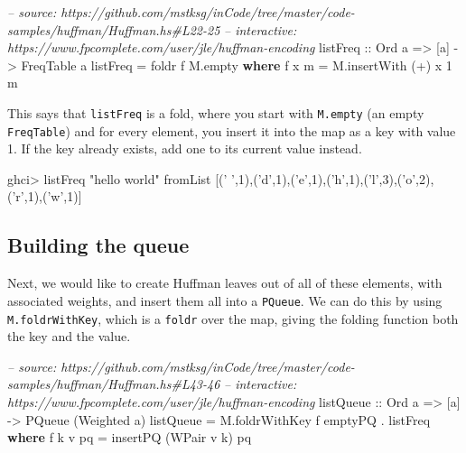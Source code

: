 \documentclass[]{article}
\newenvironment{Shaded}{}{}
\newcommand{\KeywordTok}[1]{\textcolor[rgb]{0.00,0.44,0.13}{\textbf{{#1}}}}
\newcommand{\DataTypeTok}[1]{\textcolor[rgb]{0.56,0.13,0.00}{{#1}}}
\newcommand{\DecValTok}[1]{\textcolor[rgb]{0.25,0.63,0.44}{{#1}}}
\newcommand{\CharTok}[1]{\textcolor[rgb]{0.25,0.44,0.63}{{#1}}}
\newcommand{\StringTok}[1]{\textcolor[rgb]{0.25,0.44,0.63}{{#1}}}
\newcommand{\CommentTok}[1]{\textcolor[rgb]{0.38,0.63,0.69}{\textit{{#1}}}}
\newcommand{\OtherTok}[1]{\textcolor[rgb]{0.00,0.44,0.13}{{#1}}}
\newcommand{\FunctionTok}[1]{\textcolor[rgb]{0.02,0.16,0.49}{{#1}}}
\newcommand{\NormalTok}[1]{{#1}}
\begin{document}
\begin{Shaded}
\begin{Highlighting}[]
\CommentTok{-- source: https://github.com/mstksg/inCode/tree/master/code-samples/huffman/Huffman.hs#L22-25}
\CommentTok{-- interactive: https://www.fpcomplete.com/user/jle/huffman-encoding}
\OtherTok{listFreq ::} \DataTypeTok{Ord} \NormalTok{a }\OtherTok{=>} \NormalTok{[a] }\OtherTok{->} \DataTypeTok{FreqTable} \NormalTok{a}
\NormalTok{listFreq }\FunctionTok{=} \NormalTok{foldr f M.empty}
  \KeywordTok{where}
    \NormalTok{f x m }\FunctionTok{=} \NormalTok{M.insertWith (}\FunctionTok{+}\NormalTok{) x }\DecValTok{1} \NormalTok{m}
\end{Highlighting}
\end{Shaded}

This says that \texttt{listFreq} is a fold, where you start with
\texttt{M.empty} (an empty \texttt{FreqTable}) and for every element, you insert
it into the map as a key with value 1. If the key already exists, add one to its
current value instead.

\begin{Shaded}
\begin{Highlighting}[]
\NormalTok{ghci}\FunctionTok{>} \NormalTok{listFreq }\StringTok{"hello world"}
\NormalTok{fromList [(}\CharTok{' '}\NormalTok{,}\DecValTok{1}\NormalTok{),(}\CharTok{'d'}\NormalTok{,}\DecValTok{1}\NormalTok{),(}\CharTok{'e'}\NormalTok{,}\DecValTok{1}\NormalTok{),(}\CharTok{'h'}\NormalTok{,}\DecValTok{1}\NormalTok{),(}\CharTok{'l'}\NormalTok{,}\DecValTok{3}\NormalTok{),(}\CharTok{'o'}\NormalTok{,}\DecValTok{2}\NormalTok{),(}\CharTok{'r'}\NormalTok{,}\DecValTok{1}\NormalTok{),(}\CharTok{'w'}\NormalTok{,}\DecValTok{1}\NormalTok{)]}
\end{Highlighting}
\end{Shaded}

\subsection{Building the queue}\label{building-the-queue}

Next, we would like to create Huffman leaves out of all of these elements, with
associated weights, and insert them all into a \texttt{PQueue}. We can do this
by using \texttt{M.foldrWithKey}, which is a \texttt{foldr} over the map, giving
the folding function both the key and the value.

\begin{Shaded}
\begin{Highlighting}[]
\CommentTok{-- source: https://github.com/mstksg/inCode/tree/master/code-samples/huffman/Huffman.hs#L43-46}
\CommentTok{-- interactive: https://www.fpcomplete.com/user/jle/huffman-encoding}
\OtherTok{listQueue ::} \DataTypeTok{Ord} \NormalTok{a }\OtherTok{=>} \NormalTok{[a] }\OtherTok{->} \DataTypeTok{PQueue} \NormalTok{(}\DataTypeTok{Weighted} \NormalTok{a)}
\NormalTok{listQueue }\FunctionTok{=} \NormalTok{M.foldrWithKey f emptyPQ }\FunctionTok{.} \NormalTok{listFreq}
  \KeywordTok{where}
    \NormalTok{f k v pq }\FunctionTok{=} \NormalTok{insertPQ (}\DataTypeTok{WPair} \NormalTok{v k) pq}
\end{Highlighting}
\end{Shaded}
\end{document}
